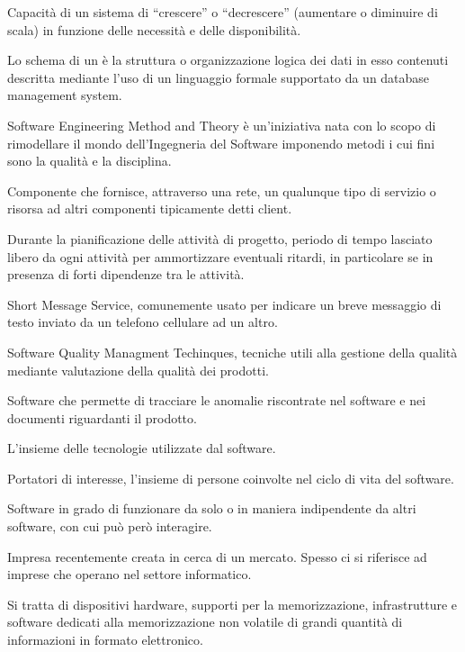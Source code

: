Capacità di un sistema di ``crescere'' o ``decrescere'' (aumentare o diminuire di scala) in funzione delle necessità e delle disponibilità.

Lo schema di un  è la struttura o organizzazione logica dei dati in esso contenuti descritta mediante l'uso di un linguaggio formale supportato da un database management system.

Software Engineering Method and Theory è un'iniziativa nata con lo scopo di rimodellare il mondo dell'Ingegneria del Software imponendo metodi i cui fini sono la qualità e la disciplina.

Componente che fornisce, attraverso una rete, un qualunque tipo di servizio o risorsa ad altri componenti tipicamente detti client.

Durante la pianificazione delle attività di progetto, periodo di tempo lasciato libero da ogni attività per ammortizzare eventuali ritardi, in particolare se in presenza di forti dipendenze tra le attività.

Short Message Service, comunemente usato per indicare un breve messaggio di testo inviato da un telefono cellulare ad un altro.

Software Quality Managment Techinques, tecniche utili alla gestione della qualità mediante valutazione della qualità dei prodotti.

Software che permette di tracciare le anomalie riscontrate nel software e nei documenti riguardanti il prodotto.

L'insieme delle tecnologie utilizzate dal software.

Portatori di interesse, l'insieme di persone coinvolte nel ciclo di vita del software.

Software in grado di funzionare da solo o in maniera indipendente da altri software, con cui può però interagire.

Impresa recentemente creata in cerca di un mercato. Spesso ci si riferisce ad imprese che operano nel settore informatico.

Si tratta di dispositivi hardware, supporti per la memorizzazione, infrastrutture e software dedicati alla memorizzazione non volatile di grandi quantità di informazioni in formato elettronico.

